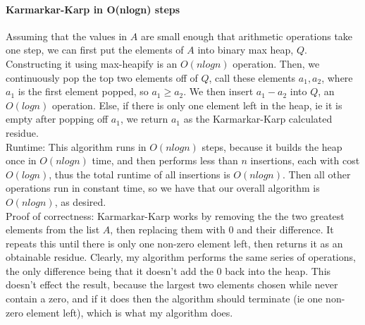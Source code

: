 \documentclass[10.5pt,letter]{article}
\begin{document}
\paragraph{Karmarkar-Karp in O(nlogn) steps} Assuming that the values in $A$ are small enough that arithmetic operations take one step, we can first put the elements of $A$ into binary max heap, $Q$. Constructing it using max-heapify is an $O(nlogn)$ operation. Then, we continuously pop the top two elements off of $Q$, call these elements $a_1, a_2$, where $a_1$ is the first element popped, so $a_1 \ge a_2$. We then insert $a_1 - a_2$ into $Q$, an $O(log n)$ operation. Else, if there is only one element left in the heap, ie it is empty after popping off $a_1$, we return $a_1$ as the Karmarkar-Karp calculated residue. \\
Runtime: This algorithm runs in $O(nlogn)$ steps, because it builds the heap once in $O(n log n)$ time, and then performs less than $n$ insertions, each with cost $O(logn)$, thus the total runtime of all insertions is $O(nlogn)$. Then all other operations run in constant time, so we have that our overall algorithm is $O(nlogn)$, as desired.  \\
Proof of correctness: Karmarkar-Karp works by removing the the two greatest elements from the list $A$, then replacing them with $0$ and their difference. It repeats this until there is only one non-zero element left, then returns it as an obtainable residue. Clearly, my algorithm performs the same series of operations, the only difference being that it doesn't add the $0$ back into the heap. This doesn't effect the result, because the largest two elements chosen while never contain a zero, and if it does then the algorithm should terminate (ie one non-zero element left), which is what my algorithm does. 
\end{document}
